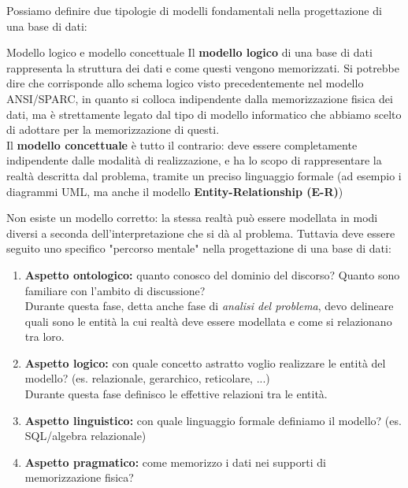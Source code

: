 \documentclass[12pt]{report}
\begin{document}
	Possiamo definire due tipologie di modelli fondamentali nella progettazione di una base di dati:
	\begin{definizione}{Modello logico e modello concettuale}{}
		Il \textbf{modello logico} di una base di dati rappresenta la struttura dei dati e come questi vengono memorizzati. Si potrebbe dire che corrisponde allo schema logico visto precedentemente nel modello ANSI/SPARC, in quanto si colloca indipendente dalla memorizzazione fisica dei dati, ma è strettamente legato dal tipo di modello informatico che abbiamo scelto di adottare per la memorizzazione di questi.\\
		\linebreak
		Il \textbf{modello concettuale} è tutto il contrario: deve essere completamente indipendente dalle modalità di realizzazione, e ha lo scopo di rappresentare la realtà descritta dal problema, tramite un preciso linguaggio formale (ad esempio i diagrammi UML, ma anche il modello \textbf{Entity-Relationship (E-R)})
	\end{definizione}
	
	Non esiste un modello corretto: la stessa realtà può essere modellata in modi diversi a seconda dell'interpretazione che si dà al problema. Tuttavia deve essere seguito uno specifico "percorso mentale" nella progettazione di una base di dati:
	\begin{enumerate}
		\item \textbf{Aspetto ontologico:} quanto conosco del dominio del discorso? Quanto sono familiare con l'ambito di discussione?\\
		Durante questa fase, detta anche fase di \textit{analisi del problema}, devo delineare quali sono le entità la cui realtà deve essere modellata e come si relazionano tra loro.
		
		\item \textbf{Aspetto logico:} con quale concetto astratto voglio realizzare le entità del modello? (es. relazionale, gerarchico, reticolare, ...)\\
		Durante questa fase definisco le effettive relazioni tra le entità.
		
		\item \textbf{Aspetto linguistico:} con quale linguaggio formale definiamo il modello? (es. SQL/algebra relazionale)
		
		\item \textbf{Aspetto pragmatico:} come memorizzo i dati nei supporti di memorizzazione fisica?
	\end{enumerate}
	
\end{document}
